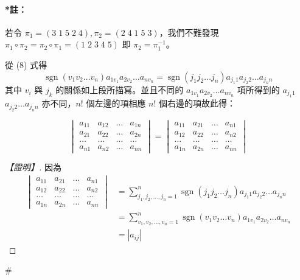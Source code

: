 \paragraph{*註：}若令 $\pi_1 = (3 \; 1 \; 5 \; 2 \; 4), \pi_2 = (2 \; 4 \; 1 \; 5 \; 3)$，我們不難發現 $\pi_1 \circ \pi_2 = \pi_2 \circ \pi_1 = (1 \; 2 \; 3 \; 4 \; 5)$ 即 $\pi_2 = \pi_1^{-1}$。

從 (8) 式得
\begin{equation}
\operatorname{sgn}(v_1 v_2 \dots v_n) a_{1v_1} a_{2v_2} \dots a_{nv_n} = \operatorname{sgn}(j_1 j_2 \dots j_n) a_{j_1 1} a_{j_2 2} \dots a_{j_n n} \label{eq:b6-1-6-9}
\end{equation}
其中 $v_i$ 與 $j_k$ 的關係如上段所描寫。並且不同的 $a_{1v_1} a_{2v_2} \dots a_{nv_n}$ 項所得到的 $a_{j_1 1}$ $a_{j_2 2} \dots a_{j_n n}$ 亦不同，$n!$ 個左邊的項相應 $n!$ 個右邊的項故此得：

\begin{theorem}\label{thm:b6-1-14}
\begin{equation}
\begin{vmatrix}
a_{11} & a_{12} & \dots & a_{1n} \\
a_{21} & a_{22} & \dots & a_{2n} \\
\dots & \dots & \dots & \dots \\
a_{n1} & a_{n2} & \dots & a_{nn}
\end{vmatrix} = \begin{vmatrix}
a_{11} & a_{21} & \dots & a_{n1} \\
a_{12} & a_{22} & \dots & a_{n2} \\
\dots & \dots & \dots & \dots \\
a_{1n} & a_{2n} & \dots & a_{nn}
\end{vmatrix} \label{eq:b6-1-6-10}
\end{equation}
\end{theorem}

\begin{proof}[【證明】]
因為
\begin{align*}
\begin{vmatrix}
a_{11} & a_{21} & \dots & a_{n1} \\
a_{12} & a_{22} & \dots & a_{n2} \\
\dots & \dots & \dots & \dots \\
a_{1n} & a_{2n} & \dots & a_{nn}
\end{vmatrix} &= \sum_{j_1, j_2, \dots, j_n=1}^n \operatorname{sgn}(j_1 j_2 \dots j_n) a_{j_1 1} a_{j_2 2} \dots a_{j_n n} \\
&= \sum_{v_1, v_2, \dots, v_n=1}^n \operatorname{sgn}(v_1 v_2 \dots v_n) a_{1v_1} a_{2v_2} \dots a_{nv_n} \\
&= |a_{ij}|
\end{align*}
\end{proof}\hfill$\#$

